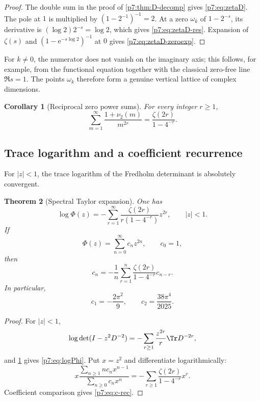 \documentclass[11pt]{article}
\numberwithin{equation}{section}
\newtheorem{theorem}{Theorem}[section]
\newtheorem{corollary}[theorem]{Corollary}
\theoremstyle{definition}
\theoremstyle{remark}
\newcommand{\e}{\mathrm e}
\begin{document}
\begin{proof}
The double sum in the proof of \cref{p7:thm:D-decomp} gives \cref{p7:eq:zetaD}.  The pole at $1$ is multiplied by $(1-2^{-1})^{-1}=2$.  At a zero $\omega_k$ of $1-2^{-s}$, its derivative is $(\log2)2^{-s}=\log2$, which gives \cref{p7:eq:zetaD-res}.  Expansion of $\zeta(s)$ and $(1-\e^{-s\log2})^{-1}$ at $0$ gives \cref{p7:eq:zetaD-zeroexp}.
\end{proof}

For $k\ne0$, the numerator does not vanish on the imaginary axis; this follows, for example, from the functional equation together with the classical zero-free line $\Re s=1$.  The points $\omega_k$ therefore form a genuine vertical lattice of complex dimensions.

\begin{corollary}[Reciprocal zero power sums]\label{p7:cor:zero-powers}
For every integer $r\ge1$,
\begin{equation}\label{p7:eq:zero-powers}
 \sum_{m=1}^{\infty}\frac{1+\nu_2(m)}{m^{2r}}
 =\frac{\zeta(2r)}{1-4^{-r}}.
\end{equation}
\end{corollary}

\subsection{Trace logarithm and a coefficient recurrence}

For $|z|<1$, the trace logarithm of the Fredholm determinant is absolutely convergent.

\begin{theorem}[Spectral Taylor expansion]\label{p7:thm:taylor}
One has
\begin{equation}\label{p7:eq:logPhi}
 \boxed{\ \log\Phi(z)
 =-\sum_{r=1}^{\infty}
 \frac{\zeta(2r)}{r(1-4^{-r})}z^{2r},
 \qquad |z|<1.\ }
\end{equation}
If
\[
 \Phi(z)=\sum_{n=0}^{\infty}c_nz^{2n},\qquad c_0=1,
\]
then
\begin{equation}\label{p7:eq:c-rec}
 \boxed{\ c_n=-\frac1n\sum_{r=1}^{n}
 \frac{\zeta(2r)}{1-4^{-r}}c_{n-r}.\ }
\end{equation}
In particular,
\begin{equation}\label{p7:eq:first-c}
 c_1=-\frac{2\pi^2}{9},
 \qquad
 c_2=\frac{38\pi^4}{2025}.
\end{equation}
\end{theorem}

\begin{proof}
For $|z|<1$,
\[
 \log\det(I-z^2D^{-2})
 =-\sum_{r\ge1}\frac{z^{2r}}r\Tr D^{-2r},
\]
and \cref{p7:cor:zero-powers} gives \cref{p7:eq:logPhi}.  Put $x=z^2$ and differentiate logarithmically:
\[
 x\frac{\sum_{n\ge1}nc_nx^{n-1}}{\sum_{n\ge0}c_nx^n}
 =-\sum_{r\ge1}\frac{\zeta(2r)}{1-4^{-r}}x^r.
\]
Coefficient comparison gives \cref{p7:eq:c-rec}.
\end{proof}
\end{document}

